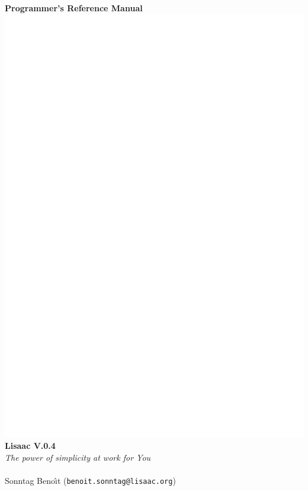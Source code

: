 \documentclass[11pt]{mybook}
\begin{document}
\begin{center}

\vskip 5mm
\Huge{\bf{}Programmer's Reference Manual}
\\
\vskip 5mm
\includegraphics[scale=2.0]{figures/lisaac}
\\
\vskip 10mm
\Huge{\bf{}Lisaac V.0.4}
\\
\vskip 15mm
\Large{\it{}The power of simplicity at work for You}
\\
\vskip 10mm
\noindent\hrulefill\\
\vskip 4mm
S{\sc{}onntag} Beno\^\i t ({\tt{}benoit.sonntag@lisaac.org})\\

\end{center}  

\noindent\hrulefill\\
\end{document}
